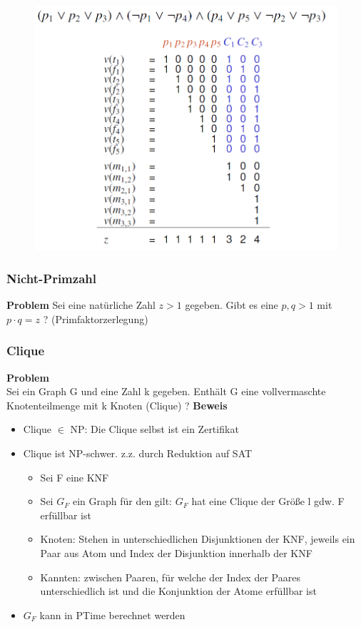 \documentclass[12pt,a4paper]{article}
\begin{document}
\begin{figure}[H]
\includegraphics[scale=0.4]{./resources/TMS_beweis.png}
\end{figure}

\subsubsection{Nicht-Primzahl}
\textbf{Problem}
Sei eine natürliche Zahl $z>1$ gegeben. Gibt es eine $p,q>1$ mit $p\cdot q = z$ ? (Primfaktorzerlegung)

\subsubsection{Clique}
\textbf{Problem}\\
Sei ein Graph G und eine Zahl k gegeben. Enthält G eine vollvermaschte Knotenteilmenge mit k Knoten (Clique) ?
\textbf{Beweis}\\
\begin{itemize}
\item Clique $\in$ NP: Die Clique selbst ist ein Zertifikat
\item Clique ist NP-schwer. z.z. durch Reduktion auf SAT
\begin{itemize}
\item Sei F eine KNF
\item Sei $G_F$ ein Graph für den gilt: $G_F$ hat eine Clique der Größe l gdw. F erfüllbar ist
\item Knoten: Stehen in unterschiedlichen Disjunktionen der KNF, jeweils ein Paar aus Atom und Index der Disjunktion innerhalb der KNF
\item Kannten: zwischen Paaren, für welche der Index der Paares unterschiedlich ist und die Konjunktion der Atome erfüllbar ist
\end{itemize}
\item $G_F$ kann in PTime berechnet werden
\end{itemize}
\end{document}
